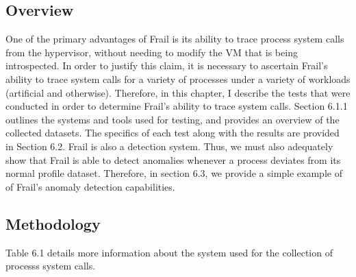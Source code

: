 \documentclass{report}
\begin{document}
\begin{spacing}{1.5}
\section{Overview}

{\large
One of the primary advantages of Frail is its ability to trace process system calls from the hypervisor, without needing to modify the VM that is being introspected. In order to justify this claim, it is necessary to ascertain Frail's ability to trace system calls for a variety of processes under a variety of workloads (artificial and otherwise). Therefore, in this chapter, I describe the tests that were conducted in order to determine Frail’s ability to trace system calls. Section 6.1.1 outlines the systems and tools used for testing, and provides an overview of the collected datasets. The specifics of each test along with the results are provided in Section 6.2. Frail is also a detection system. Thus, we must also adequately show that Frail is able to detect anomalies whenever a process deviates from its normal profile dataset. Therefore, in section 6.3, we provide a simple example of of Frail's anomaly detection capabilities. 
\newline
}

\newpage
\subsection{Methodology}
{\large
Table 6.1 details more information about the system used for the collection of processs system calls.
\newline
}


\end{spacing}
\end{document}
